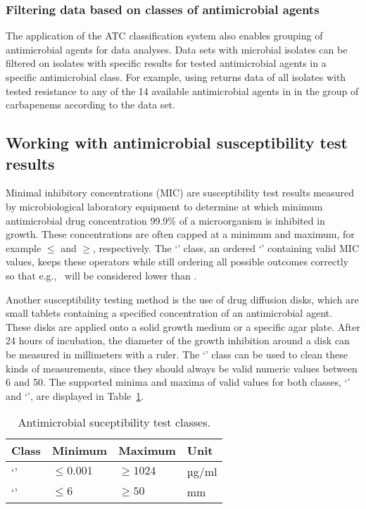 \documentclass[article, shortnames]{jss}
\newcommand{\class}[1]{`\code{#1}'}
\begin{document}
\subsubsection{Filtering data based on classes of antimicrobial agents}

The application of the ATC classification system also enables grouping of
antimicrobial agents for data analyses.  Data sets with microbial isolates
can be filtered on isolates with specific results for tested antimicrobial
agents in a specific antimicrobial class.  For example, using
 returns data of all isolates with
tested resistance to any of the 14 available antimicrobial agents in in the
group of carbapenems according to the  data set.

\subsection{Working with antimicrobial susceptibility test results}

Minimal inhibitory concentrations (MIC) are susceptibility test results
measured by microbiological laboratory equipment to determine at which
minimum antimicrobial drug concentration 99.9\% of a microorganism is
inhibited in growth.  These concentrations are often capped at a minimum and
maximum, for example $\leq$ and $\geq$,
respectively.  The \class{mic} class, an ordered \class{factor} containing
valid MIC values, keeps these operators while still ordering all possible
outcomes correctly so that e.g.,~ will be considered lower
than .

Another susceptibility testing method is the use of drug diffusion disks,
which are small tablets containing a specified concentration of an
antimicrobial agent.  These disks are applied onto a solid growth medium or
a specific agar plate.  After 24 hours of incubation, the diameter of the
growth inhibition around a disk can be measured in millimeters with a ruler. 
The \class{disk} class can be used to clean these kinds of measurements,
since they should always be valid numeric values between 6 and 50.  The
supported minima and maxima of valid values for both classes, \class{mic}
and \class{disk}, are displayed in Table~\ref{tab:susceptclasses}.
%
\begin{table}[t!]
\centering
\begin{tabular}{llll}
\hline
Class & Minimum & Maximum & Unit \\ 
\hline
\class{mic}  & $\leq 0.001$ & $\geq 1024$ & µg/ml \\
\class{disk} & $\leq 6$ & $\geq 50$ & mm \\ 
\hline
\end{tabular}
\caption{Antimicrobial suceptibility test classes.}
\label{tab:susceptclasses}
\end{table}
%
\end{document}
